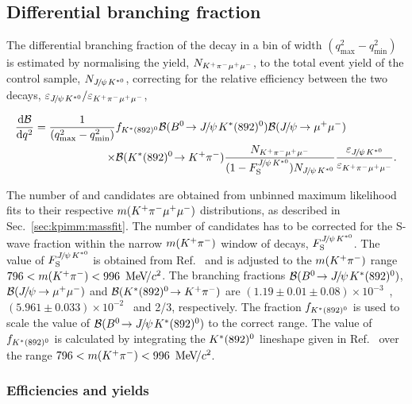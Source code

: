 \subsection{Differential branching fraction}
\label{sec:kpimm:bf}
 
The differential branching fraction of the decay \BdToKpimm in a \qsq bin of width $(q^{2}_{\text{max}} - q^{2}_{\text{min}})$ is estimated by normalising the \BdToKpimm yield, $N_{{{K}^+}{{\pi}^-}{\mu^+}{\mu^-}}$, to the total event yield of the \BdToJPsiKst control sample, $N_{{{J\mskip -3mu/\mskip -2mu\psi\mskip 2mu}}{{K}^{*0}}}$, correcting for the relative efficiency between the two decays, $\varepsilon_{{{J\mskip -3mu/\mskip -2mu\psi\mskip 2mu}}{{K}^{*0}}}/\varepsilon_{{{K}^+}{{\pi}^-}{\mu^+}{\mu^-}}$,
 
\begin{equation}
\begin{split}
\frac{\deriv\BF}{\deriv\qsq} = \frac{1}{(q^{2}_{\text{max}} - q^{2}_{\text{min}}) }&f_{\KstP}\BF(\BdToJPsiKstP)\BF(\decay{\jpsi}{\mumu}) \\
\times&\BF(\decay{\KstP}{\Kp\pim})\frac{N_{\kpimm}}{(1-F_{\rm S}^{\jpsi\Kstarz})N_{\jpsi\Kstarz}} \frac{\varepsilon_{\jpsi\Kstarz}}{\varepsilon_{\kpimm}}.
\end{split}
\label{eqn:dbfdq2}
\end{equation}
 
\noindent The number of \BdToJPsiKst and \BdToKpimm candidates are obtained from unbinned maximum likelihood fits to their respective $m({{K}^+}{{\pi}^-}{\mu^+}{\mu^-})$ distributions, as described in Sec.~\ref{sec:kpimm:massfit}. The number of \BdToJPsiKst candidates has to be corrected for the S-wave fraction within the narrow $m({{K}^+}{{\pi}^-})$ window of \BdToJPsiKst decays, $F_{\rm S}^{{{J\mskip -3mu/\mskip -2mu\psi\mskip 2mu}}{{K}^{*0}}}$. The value of $F_{\rm S}^{{{J\mskip -3mu/\mskip -2mu\psi\mskip 2mu}}{{K}^{*0}}}$ is obtained from Ref.~\cite{LHCb-JpsiKstar} and is adjusted to the $m({{K}^+}{{\pi}^-})$ range $796<m({{K}^+}{{\pi}^-})<996~{\mathrm{\,Me\kern -0.1em V\!/}c^2}$. The branching fractions ${\mathcal{B}}({{B}^0}\!\rightarrow {\ensuremath{{J\mskip -3mu/\mskip -2mu\psi\mskip 2mu}}}{\ensuremath{K}}^{*}(892)^{0})$, ${\mathcal{B}}({{J\mskip -3mu/\mskip -2mu\psi\mskip 2mu}}\!\rightarrow {\ensuremath{\mu^+\mu^-}})$ and ${\mathcal{B}}({K}^{*}(892)^{0}\!\rightarrow {\ensuremath{{K}^+}}{\ensuremath{{\pi}^-}})$ are $(1.19\pm0.01\pm0.08)\times10^{-3}$~\cite{belle-z-paper}, $(5.961 \pm 0.033) \times 10^{-2}$~\cite{pdg} and 2/3, respectively. The fraction $f_{{K}^{*}(892)^{0}}$ is used to scale the value of ${\mathcal{B}}({{B}^0}\!\rightarrow {\ensuremath{{J\mskip -3mu/\mskip -2mu\psi\mskip 2mu}}}{\ensuremath{K}}^{*}(892)^{0})$ to the correct \mkpi range.  The value of $f_{{K}^{*}(892)^{0}}$ is calculated by integrating the ${K}^{*}(892)^{0}$ lineshape given in Ref.~\cite{belle-z-paper} over the range $796<m({{K}^+}{{\pi}^-})<996~{\mathrm{\,Me\kern -0.1em V\!/}c^2}$.
 
\subsubsection{Efficiencies and yields}

